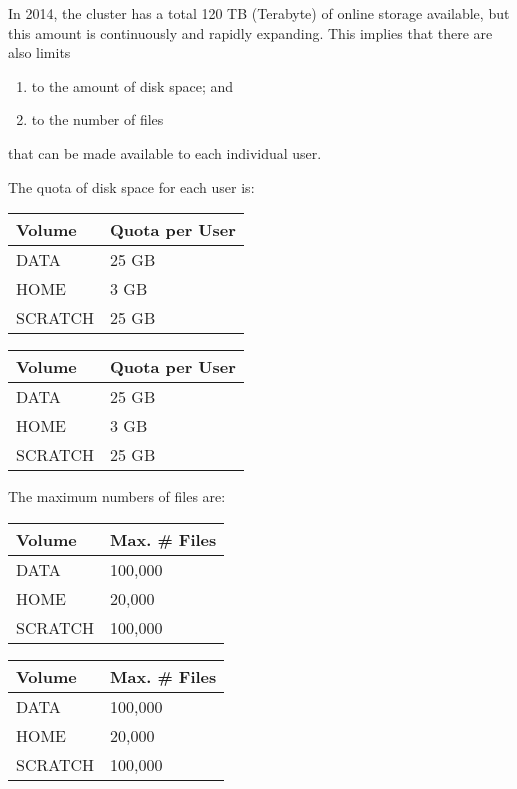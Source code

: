 In 2014, the \hpc cluster has a total 120 TB (Terabyte) of online storage
available, but this amount is continuously and rapidly expanding. This implies
that there are also limits
\begin{enumerate}
\item  to the amount of disk space; and
\item  to the number of files
\end{enumerate}

that can be made available to each individual \hpc user.

The quota of disk space for each \hpc user is:
\ifantwerpen
\begin{tabular}{|p{0.7in}|p{1.0in}|} \hline
\textbf{Volume} & \textbf{Quota per User} \\ \hline
DATA            & 25 GB \\ \hline
HOME            & 3 GB \\ \hline
SCRATCH         & 25 GB \\ \hline
\end{tabular}
\fi
\ifgent
\begin{tabular}{|p{0.7in}|p{1.0in}|} \hline
\textbf{Volume} & \textbf{Quota per User} \\ \hline
DATA            & 25 GB \\ \hline
HOME            & 3 GB \\ \hline
SCRATCH         & 25 GB \\ \hline
\end{tabular}
\fi

The maximum numbers of files are:
\ifantwerpen
\begin{tabular}{|p{0.7in}|p{1.0in}|} \hline
\textbf{Volume} & \textbf{Max. \# Files} \\ \hline
DATA            & 100,000 \\ \hline
HOME            & 20,000 \\ \hline
SCRATCH         & 100,000 \\ \hline
\end{tabular}
\fi

\ifgent
\begin{tabular}{|p{0.7in}|p{1.0in}|} \hline
\textbf{Volume} & \textbf{Max. \# Files} \\ \hline
DATA            & 100,000 \\ \hline
HOME            & 20,000 \\ \hline
SCRATCH         & 100,000 \\ \hline
\end{tabular}
\fi

